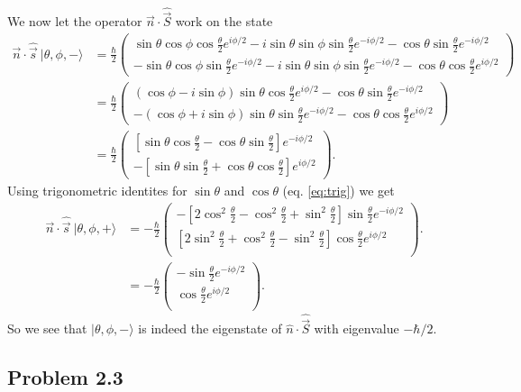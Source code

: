 \documentclass[a4paper, 11pt, titlepage, english]{article}
\newcommand{\ket}[1]{|#1 \rangle}
\newcommand{\op}[1]{\hat{#1}}
\begin{document}
We now let the operator $\vec{n}\cdot\op{\vec{S}}$ work on the state
\begin{align*}
\vec{n}\cdot\op{\vec{s}}\ \ket{\theta, \phi, -} &= \frac{\hbar}{2} 
\begin{pmatrix} 
\sin\theta\cos\phi\cos{\frac{\theta}{2}}e^{i\phi/2} - i\sin\theta\sin\phi \sin{\frac{\theta}{2}}e^{-i\phi/2} - \cos\theta\sin\frac{\theta}{2}e^{-i\phi/2} \\[0.1cm]
-\sin\theta\cos\phi\sin\frac{\theta}{2}e^{-i\phi/2} - i\sin\theta\sin\phi\sin\frac{\theta}{2}e^{-i\phi/2} -\cos\theta\cos{\frac{\theta}{2}}e^{i\phi/2}
\end{pmatrix} \\[0.5cm]
&= 
\frac{\hbar}{2} 
\begin{pmatrix}
\left(\cos\phi - i\sin\phi\right)\sin\theta\cos{\frac{\theta}{2}}e^{i\phi/2} - \cos\theta\sin\frac{\theta}{2}e^{-i\phi/2}  \\[0.1cm]
-\left(\cos\phi + i\sin\phi\right)\sin\theta\sin\frac{\theta}{2}e^{-i\phi/2} - \cos\theta\cos{\frac{\theta}{2}}e^{i\phi/2}
\end{pmatrix} \\[0.5cm]
&= \frac{\hbar}{2}
\begin{pmatrix}
\left[\sin\theta\cos\frac{\theta}{2} - \cos\theta\sin\frac{\theta}{2}\right]e^{-i\phi/2}  \\[0.1cm]
-\left[\sin\theta\sin\frac{\theta}{2} + \cos\theta\cos{\frac{\theta}{2}}\right]e^{i\phi/2}
\end{pmatrix}.
\end{align*}
Using trigonometric identites for $\sin\theta$ and $\cos\theta$ (eq. \ref{eq:trig}) we get
\begin{align*}
\vec{n}\cdot\op{\vec{s}}\ \ket{\theta, \phi, +} &= -\frac{\hbar}{2}
\begin{pmatrix}
-\left[2\cos^2\frac{\theta}{2} - \cos^2\frac{\theta}{2} + \sin^2{\frac{\theta}{2}}\right]\sin\frac{\theta}{2} e^{-i\phi/2}  \\[0.1cm]
\left[2\sin^2{\frac{\theta}{2}} + \cos^2\frac{\theta}{2}  - \sin^2{\frac{\theta}{2}}\right]\cos\frac{\theta}{2}e^{i\phi/2}  \\
\end{pmatrix}. \\[0.5cm] &= -\frac{\hbar}{2}
\begin{pmatrix}
-\sin\frac{\theta}{2}e^{-i\phi/2}  \\[0.1cm]
\cos\frac{\theta}{2}e^{i\phi/2}  \\
\end{pmatrix}.
\end{align*}
So we see that $\ket{\theta,\phi,-}$ is indeed the eigenstate of $\op{n}\cdot\op{\vec{S}}$ with eigenvalue $-\hbar/2$. 

\clearpage
\subsection*{Problem 2.3}
\end{document}
